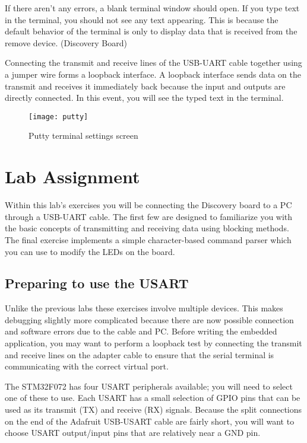 \documentclass[openany,11pt,fleqn]{book} %
\begin{document}
If there aren't any errors, a blank terminal window should open. If you type text in the terminal, you should not see any text appearing. This is because the default behavior of the terminal is only to display data that is received from the remove device. (Discovery Board) 

Connecting the transmit and receive lines of the USB-UART cable together using a jumper wire forms a loopback interface. A loopback interface sends data on the transmit and receives it immediately back because the input and outputs are directly connected. In this event, you will see the typed text in the terminal. 

\begin{figure}[]
    \centering\texttt{[image: putty]}
    \caption{Putty terminal settings screen}
    \label{putty}
\end{figure}



\section{Lab Assignment}
Within this lab's exercises you will be connecting the Discovery board to a PC through a USB-UART cable. The first few are designed to familiarize you with the basic concepts of transmitting and receiving data using blocking methods. The final exercise implements a simple character-based command parser which you can use to modify the LEDs on the board.  

\subsection{Preparing to use the USART} 
Unlike the previous labs these exercises involve multiple devices. This makes debugging slightly more complicated because there are now possible connection and software errors due to the cable and PC. Before writing the embedded application, you may want to perform a loopback test by connecting the transmit and receive lines on the adapter cable to ensure that the serial terminal is communicating with the correct virtual port. 

The STM32F072 has four USART peripherals available; you will need to select one of these to use. Each USART has a small selection of GPIO pins that can be used as its transmit (TX) and receive (RX) signals. Because the split connections on the end of the Adafruit USB-USART cable are fairly short, you will want to choose USART output/input pins that are relatively near a GND pin.
 
\end{document}
